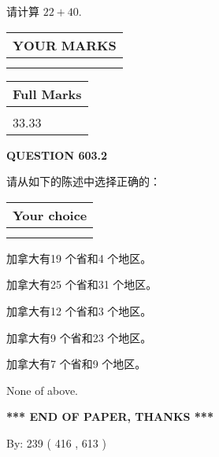 \documentclass{ctexart}
\begin{document}
  
 
请计算 $ %
22 +  %
40 $.
 

 

 
  
\vspace{0.2in}
  
\noindent\begin{tabular}{|l|}
\hline
 YOUR MARKS  \\
\hline
 \\ 
 \\ 
\hline
\end{tabular}
\hspace{0.05in} \begin{tabular}{|l|}
\hline
 Full Marks  \\
\hline
 \\ 
33.33 \\
\hline
\end{tabular}
{\textbf{\Large{QUESTION
603.2 
}}}
  
  
请从如下的陈述中选择正确的：
  
  
\noindent\hspace{3.0in} \begin{tabular}{|l|}
\hline
Your choice \\
\hline
 \\ 
 \\ 
\hline
\end{tabular}
  
  
 
 
加拿大有19 个省和4 个地区。
 
 
加拿大有25 个省和31 个地区。
 
 
加拿大有12 个省和3 个地区。
 
 
加拿大有9 个省和23 个地区。
 
 
加拿大有7 个省和9 个地区。
 
 
 None of above.
 
 
   
   
 \vspace{0.2in}
 
   
   
   
   
\vspace{1.0in} 
{\textbf{\large{ *** END OF PAPER, THANKS *** }}} 
   
   
\hspace{1.0in} By: 
 239 ( 416 ,  613 )
   
\end{document}
